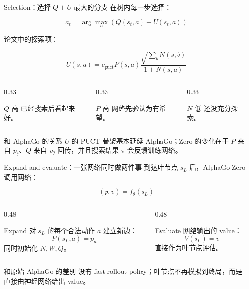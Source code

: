 \documentclass[UTF8,aspectratio=169,10pt]{ctexbeamer}
\begin{document}
\begin{frame}{Selection：选择 $Q+U$ 最大的分支}
  \small
  在树内每一步选择：

  \[
    a_t=\arg\max_a \left(Q(s_t,a)+U(s_t,a)\right)
  \]

  论文中的探索项：

  \[
    U(s,a)=c_{\mathrm{puct}}P(s,a)
    \frac{\sqrt{\sum_b N(s,b)}}{1+N(s,a)}
  \]

  \begin{columns}[T,onlytextwidth]
    \begin{column}{0.33\textwidth}
      \begin{block}{$Q$ 高}
        已经搜索后看起来好。
      \end{block}
    \end{column}
    \begin{column}{0.33\textwidth}
      \begin{block}{$P$ 高}
        网络先验认为有希望。
      \end{block}
    \end{column}
    \begin{column}{0.33\textwidth}
      \begin{block}{$N$ 低}
        还没充分探索。
      \end{block}
    \end{column}
  \end{columns}

  \begin{alertblock}{和 AlphaGo 的关系}
    $U$ 的 PUCT 骨架基本延续 AlphaGo；Zero 的变化在于 $P$ 来自 $p_{\theta}$、$Q$ 来自 $v_{\theta}$ 回传，并且搜索结果 $\pi$ 会反馈训练网络。
  \end{alertblock}
\end{frame}

\begin{frame}{Expand and evaluate：一张网络同时做两件事}
  到达叶节点 $s_L$ 后，AlphaGo Zero 调用网络：

  \[
    (p,v)=f_{\theta}(s_L)
  \]

  \begin{columns}[T,onlytextwidth]
    \begin{column}{0.48\textwidth}
      \begin{block}{Expand}
        对 $s_L$ 的每个合法动作 $a$ 建立新边：
        \[
          P(s_L,a)=p_a
        \]
        同时初始化 $N,W,Q$。
      \end{block}
    \end{column}
    \begin{column}{0.48\textwidth}
      \begin{block}{Evaluate}
        网络输出的 value：
        \[
          V(s_L)=v
        \]
        直接作为叶节点评估。
      \end{block}
    \end{column}
  \end{columns}

  \begin{alertblock}{和原始 AlphaGo 的差别}
    没有 fast rollout policy；叶节点不再模拟到终局，而是直接由神经网络给出 value。
  \end{alertblock}
\end{frame}
\end{document}
